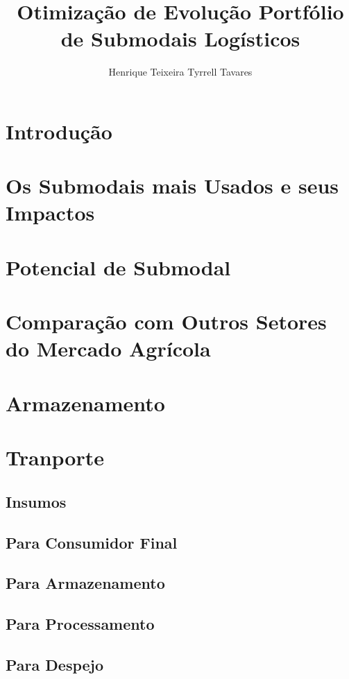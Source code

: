 \documentclass[]{article}
\title{Otimização de Evolução Portfólio de Submodais Logísticos}
\author{Henrique Teixeira Tyrrell Tavares}
\begin{document}
	
	\maketitle
	
	\begin{abstract}
		
	\end{abstract}
	
	\section{Introdução}
	
	\section{Os Submodais mais Usados e seus Impactos}
	
	\section{Potencial de Submodal}
	
	\section{Comparação com Outros Setores do Mercado Agrícola}
	
	\section{Armazenamento}
	
	\section{Tranporte}
	
	\subsection{Insumos}
	
	\subsection{Para Consumidor Final}
	
	\subsection{Para Armazenamento}
	
	\subsection{Para Processamento}
	
	\subsection{Para Despejo}
	
	
	
\end{document}

